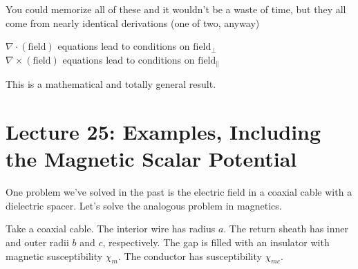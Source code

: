 \documentclass{article}
\newcommand*\circled[1]{\tikz[baseline=(char.base)]{
            \node[shape=circle,draw,inner sep=2pt] (char) {#1};}}
\numberwithin{equation}{section}
\begin{document}
You could memorize all of these and it wouldn't be a waste of time, but they all come from nearly identical derivations (one of two, anyway)

\begin{mdframed}[backgroundcolor=WHITE,align=center,userdefinedwidth=30em]

\begin{center}
    
$\nabla \cdot (\text{field})$ equations lead to conditions on $\text{field}_{\perp}$ \\

$\nabla \times (\text{field})$ equations lead to conditions on $\text{field}_{\parallel}$
    
\end{center}

\end{mdframed}

This is a mathematical and totally general result.

\newpage

\section*{Lecture 25: Examples, Including the Magnetic Scalar Potential}
\setcounter{page}{1}

One problem we've solved in the past is the electric field in a coaxial cable with a dielectric spacer. Let's solve the analogous problem in magnetics.

Take a coaxial cable. The interior wire has radius $a$. The return sheath has inner and outer radii $b$ and $c$, respectively. The gap is filled with an insulator with magnetic susceptibility $\chi_m$. The conductor has susceptibility $\chi_{mc}$.

\begin{figure}[H]
\centering
{}
\label{fig:25a}
\end{figure}
\end{document}
